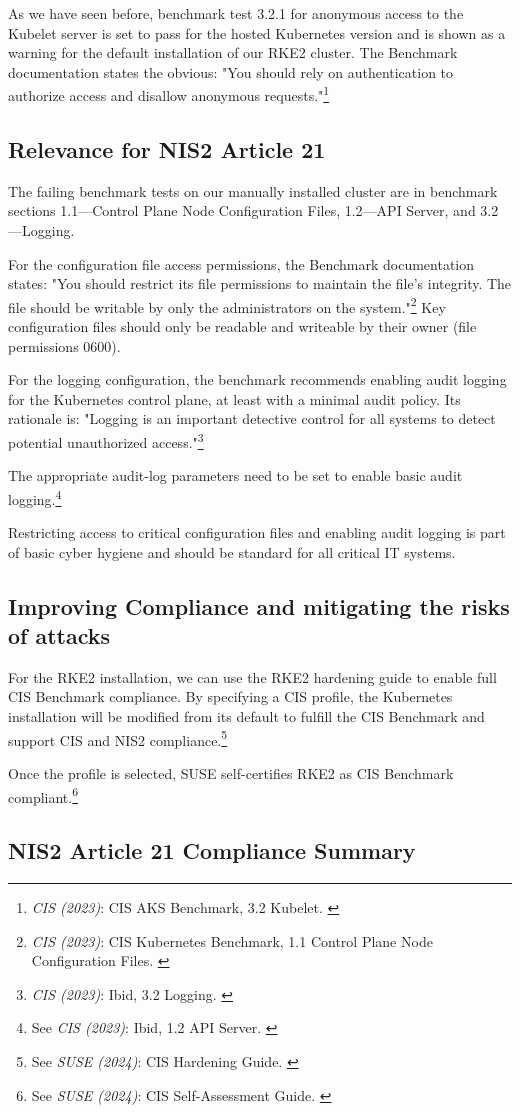 As we have seen before, benchmark test 3.2.1 for anonymous access to the Kubelet server is set to pass for the hosted Kubernetes version and is shown as a warning for the default installation of our RKE2 cluster. The Benchmark documentation states the obvious: "You should rely on authentication to authorize access and disallow anonymous requests."\footnote{\textit{CIS (2023)}: CIS AKS Benchmark, 3.2 Kubelet. \cite{cisAks}}

\subsection{Relevance for NIS2 Article 21}

The failing benchmark tests on our manually installed cluster are in benchmark sections 1.1—Control Plane Node Configuration Files, 1.2—API Server, and 3.2—Logging.

For the configuration file access permissions, the Benchmark documentation states: "You should restrict its file permissions to maintain the file's integrity. The file should be writable by only the administrators on the system."\footnote{\textit{CIS (2023)}: CIS Kubernetes Benchmark, 1.1 Control Plane Node Configuration Files. \cite{cisAks}} Key configuration files should only be readable and writeable by their owner (file permissions 0600).

For the logging configuration, the benchmark recommends enabling audit logging for the Kubernetes control plane, at least with a minimal audit policy. Its rationale is: "Logging is an important detective control for all systems to detect potential unauthorized access."\footnote{\textit{CIS (2023)}: Ibid, 3.2 Logging. \cite{cisAks}}

The appropriate audit-log parameters need to be set to enable basic audit logging.\footnote{See \textit{CIS (2023)}: Ibid, 1.2 API Server. \cite{cisAks}}

Restricting access to critical configuration files and enabling audit logging is part of basic cyber hygiene and should be standard for all critical IT systems.

\subsection{Improving Compliance and mitigating the risks of attacks}

For the RKE2 installation, we can use the RKE2 hardening guide to enable full CIS Benchmark compliance. By specifying a CIS profile, the Kubernetes installation will be modified from its default to fulfill the CIS Benchmark and support CIS and NIS2 compliance.\footnote{See \textit{SUSE (2024)}: CIS Hardening Guide. \cite{rke2Hardening}}

Once the profile is selected, SUSE self-certifies RKE2 as CIS Benchmark compliant.\footnote{See \textit{SUSE (2024)}: CIS Self-Assessment Guide. \cite{rke2Self}}

\subsection{NIS2 Article 21 Compliance Summary}
